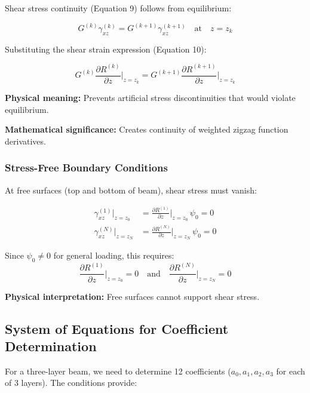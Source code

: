 \documentclass[12pt,a4paper]{article}
\begin{document}
Shear stress continuity (Equation 9) follows from equilibrium:

\begin{equation}
G^{(k)} \gamma_{xz}^{(k)} = G^{(k+1)} \gamma_{xz}^{(k+1)} \quad \text{at} \quad z = z_k
\end{equation}

Substituting the shear strain expression (Equation 10):

\begin{equation}
G^{(k)} \frac{\partial R^{(k)}}{\partial z}\bigg|_{z=z_k} =
G^{(k+1)} \frac{\partial R^{(k+1)}}{\partial z}\bigg|_{z=z_k}
\end{equation}

\textbf{Physical meaning:} Prevents artificial stress discontinuities that would violate equilibrium.

\textbf{Mathematical significance:} Creates continuity of weighted zigzag function derivatives.

\subsubsection{Stress-Free Boundary Conditions}

At free surfaces (top and bottom of beam), shear stress must vanish:

\begin{align}
\gamma_{xz}^{(1)}\bigg|_{z=z_0} &= \frac{\partial R^{(1)}}{\partial z}\bigg|_{z=z_0} \, \psi_0 = 0 \\
\gamma_{xz}^{(N)}\bigg|_{z=z_N} &= \frac{\partial R^{(N)}}{\partial z}\bigg|_{z=z_N} \, \psi_0 = 0
\end{align}

Since $\psi_0 \neq 0$ for general loading, this requires:
\begin{equation}
\frac{\partial R^{(1)}}{\partial z}\bigg|_{z=z_0} = 0 \quad \text{and} \quad \frac{\partial R^{(N)}}{\partial z}\bigg|_{z=z_N} = 0
\end{equation}

\textbf{Physical interpretation:} Free surfaces cannot support shear stress.

\subsection{System of Equations for Coefficient Determination}

For a three-layer beam, we need to determine 12 coefficients ($a_0, a_1, a_2, a_3$ for each of 3 layers). The conditions provide:
\end{document}
